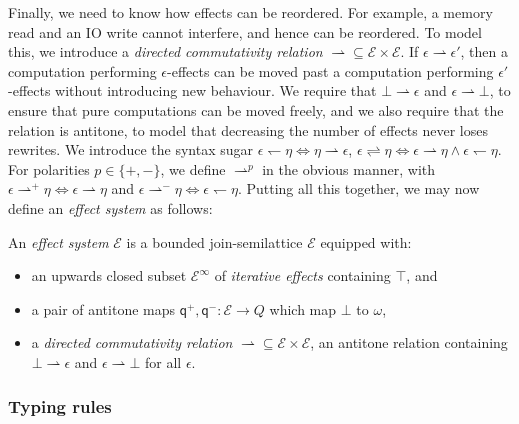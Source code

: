 \documentclass[acmsmall,screen,review]{acmart}
\newcommand{\mc}[1]{\ensuremath{\mathcal{#1}}}
\newcommand{\ms}[1]{\ensuremath{\mathsf{#1}}}
\newcommand{\rightmove}{\rightharpoonup}
\newcommand{\leftmove}{\leftharpoondown}
\newcommand{\slides}{\rightleftharpoons}
\newcommand{\topq}{\omega}
\newcommand{\alquant}{\ms{q}}
\begin{document}
Finally, we need to know how effects can be reordered. For example, a memory read and an IO write
cannot interfere,  and hence
can be reordered. To model this, we introduce a \emph{directed commutativity
relation} $\rightmove \subseteq \mc{E} \times \mc{E}$. If $\epsilon
\rightmove \epsilon'$, then a computation performing $\epsilon$-effects can be moved past a
computation performing $\epsilon'$-effects without introducing new behaviour. We require that $\bot
\rightmove \epsilon$ and $\epsilon \rightmove \bot$, to ensure that pure computations can be moved
freely, and we also require that the relation is antitone, to model that decreasing the number of
effects never loses rewrites. 
%
We introduce the syntax sugar $\epsilon \leftmove \eta \iff \eta \rightmove \epsilon$, $\epsilon
\slides \eta \iff \epsilon \rightmove \eta \land \epsilon \leftmove \eta$. For polarities $p \in
\{+, -\}$, we define $\rightmove^p$ in the obvious manner, with $\epsilon \rightmove^+ \eta \iff
\epsilon \rightmove \eta$ and $\epsilon \rightmove^- \eta \iff \epsilon \leftmove \eta$.
%
Putting all this together, we may now define an \emph{effect system} as follows:
\begin{definition}
  An \emph{effect system} $\mc{E}$ is a bounded join-semilattice $\mc{E}$
  equipped with:
  \begin{itemize}
  \item an upwards closed subset $\mc{E}^\infty$ of \emph{iterative effects} containing $\top$, and
  \item a pair of antitone maps $\alquant^+, \alquant^- : \mc{E} \to Q$ which map $\bot$ to $\topq$,
  \item a \emph{directed commutativity relation} $\rightmove \subseteq \mc{E} \times \mc{E}$,
  an antitone relation containing $\bot \rightmove \epsilon$ and $\epsilon \rightmove \bot$ for all $\epsilon$. 
  \end{itemize}

\end{definition}


\subsubsection{Typing rules}
\end{document}
